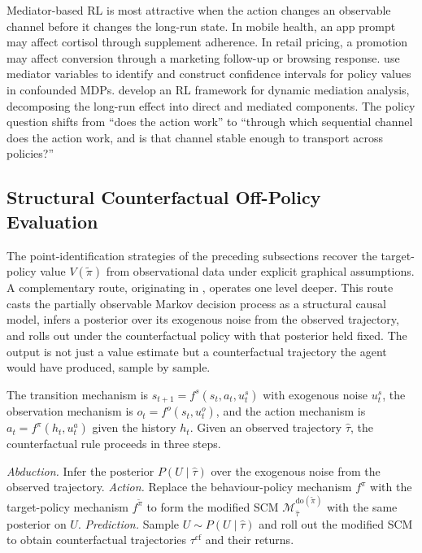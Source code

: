 Mediator-based RL is most attractive when the action changes an observable channel before it changes the long-run state. In mobile health, an app prompt may affect cortisol through supplement adherence. In retail pricing, a promotion may affect conversion through a marketing follow-up or browsing response. \citet{shiZhuShenLuoZhuSong2024cmdpCI} use mediator variables to identify and construct confidence intervals for policy values in confounded MDPs. \citet{geEtAl2023dynamicMediation} develop an RL framework for dynamic mediation analysis, decomposing the long-run effect into direct and mediated components. The policy question shifts from ``does the action work'' to ``through which sequential channel does the action work, and is that channel stable enough to transport across policies?''

\subsection{Structural Counterfactual Off-Policy Evaluation}
\label{subsec:cfope_scm}

The point-identification strategies of the preceding subsections recover the target-policy value $V(\widetilde\pi)$ from observational data under explicit graphical assumptions. A complementary route, originating in \citet{buesing2019woulda}, operates one level deeper. This route casts the partially observable Markov decision process as a structural causal model, infers a posterior over its exogenous noise from the observed trajectory, and rolls out under the counterfactual policy with that posterior held fixed. The output is not just a value estimate but a counterfactual trajectory the agent would have produced, sample by sample.

The transition mechanism is $s_{t+1} = f^s(s_t, a_t, u^s_t)$ with exogenous noise $u^s_t$, the observation mechanism is $o_t = f^o(s_t, u^o_t)$, and the action mechanism is $a_t = f^\pi(h_t, u^a_t)$ given the history $h_t$. Given an observed trajectory $\hat\tau$, the counterfactual rule proceeds in three steps.

\begin{algorithm}[h]
\caption{Counterfactual off-policy evaluation \citep{buesing2019woulda}}
\label{alg:buesing_cfope}
\begin{algorithmic}[1]
\State \emph{Abduction.} Infer the posterior $P(U \mid \hat\tau)$ over the exogenous noise from the observed trajectory.
\State \emph{Action.} Replace the behaviour-policy mechanism $f^\pi$ with the target-policy mechanism $f^{\widetilde\pi}$ to form the modified SCM $\mathcal M^{\mathrm{do}(\widetilde\pi)}_{\hat\tau}$ with the same posterior on $U$.
\State \emph{Prediction.} Sample $U \sim P(U \mid \hat\tau)$ and roll out the modified SCM to obtain counterfactual trajectories $\tau^{\mathrm{cf}}$ and their returns.
\end{algorithmic}
\end{algorithm}

